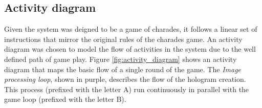 \newpage

\subsection{Activity diagram}
\begin{figure}[h!]
\end{figure}
Given the system was deigned to be a game of charades, it follows a linear set of instructions that mirror the original rules of the charades game. An activity diagram was chosen to model the flow of activities in the system due to the well defined path of game play. Figure \ref{fig:activity_diagram} shows an activity diagram that maps the basic flow of a single round of the game. The \textit{Image processing loop}, shown in purple, describes the flow  of the hologram creation. This process (prefixed with the letter A) run continuously in parallel with the game loop (prefixed with the letter B).

